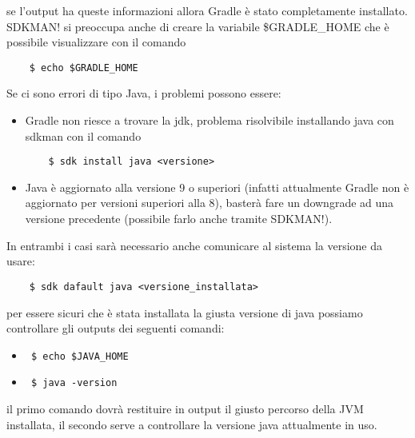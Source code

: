 se l'output ha queste informazioni allora Gradle è stato completamente installato. SDKMAN! si preoccupa anche di creare la variabile \$GRADLE\_HOME che è possibile visualizzare con il comando 
\begin{verbatim} 
    $ echo $GRADLE_HOME \end{verbatim} 
Se ci sono errori di tipo Java, i problemi possono essere:
\begin{itemize}
  \item Gradle non riesce a trovare la jdk, problema risolvibile installando java con sdkman con il comando 
  \begin{verbatim}
    $ sdk install java <versione>  \end{verbatim}
  \item Java è aggiornato alla versione 9 o superiori (infatti attualmente Gradle non è aggiornato per versioni superiori alla 8), basterà fare un downgrade ad una versione precedente (possibile farlo anche tramite SDKMAN!).
\end{itemize}
In entrambi i casi sarà necessario anche comunicare al sistema la versione da usare: 
\begin{verbatim}  
    $ sdk dafault java <versione_installata> \end{verbatim} 
per essere sicuri che è stata installata la giusta versione di java possiamo controllare gli outputs dei seguenti comandi:
\begin{itemize}
  \item \begin{verbatim} $ echo $JAVA_HOME \end{verbatim}
  \item \begin{verbatim} $ java -version \end{verbatim}
\end{itemize}
il primo comando dovrà restituire in output il giusto percorso della JVM installata, il secondo serve a controllare la versione java attualmente in uso.


